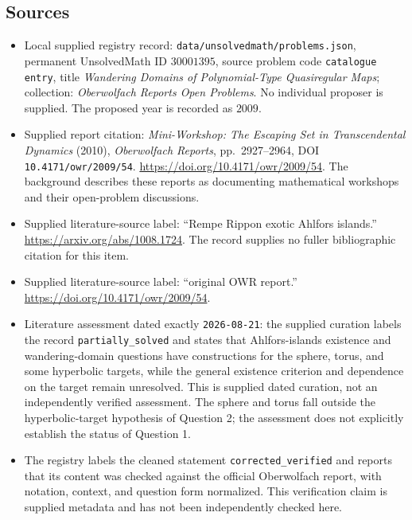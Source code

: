 \documentclass[11pt]{article}
\begin{document}
\subsection{Sources}
\begin{itemize}
\item Local supplied registry record: \texttt{data/unsolvedmath/problems.json}, permanent UnsolvedMath ID \(30001395\), source problem code \texttt{catalogue entry}, title \emph{Wandering Domains of Polynomial-Type Quasiregular Maps}; collection: \emph{Oberwolfach Reports Open Problems}. No individual proposer is supplied. The proposed year is recorded as \(2009\).
\item Supplied report citation: \emph{Mini-Workshop: The Escaping Set in Transcendental Dynamics} (2010), \emph{Oberwolfach Reports}, pp.\ 2927--2964, DOI \texttt{10.4171/owr/2009/54}. \url{https://doi.org/10.4171/owr/2009/54}. The background describes these reports as documenting mathematical workshops and their open-problem discussions.
\item Supplied literature-source label: ``Rempe Rippon exotic Ahlfors islands.'' \url{https://arxiv.org/abs/1008.1724}. The record supplies no fuller bibliographic citation for this item.
\item Supplied literature-source label: ``original OWR report.'' \url{https://doi.org/10.4171/owr/2009/54}.
\item Literature assessment dated exactly \texttt{2026-08-21}: the supplied curation labels the record \texttt{partially\_solved} and states that Ahlfors-islands existence and wandering-domain questions have constructions for the sphere, torus, and some hyperbolic targets, while the general existence criterion and dependence on the target remain unresolved. This is supplied dated curation, not an independently verified assessment. The sphere and torus fall outside the hyperbolic-target hypothesis of Question 2; the assessment does not explicitly establish the status of Question 1.
\item The registry labels the cleaned statement \texttt{corrected\_verified} and reports that its content was checked against the official Oberwolfach report, with notation, context, and question form normalized. This verification claim is supplied metadata and has not been independently checked here.
\end{itemize}
\end{document}
